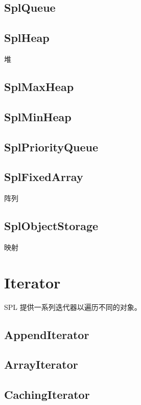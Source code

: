 \section{SplQueue}


\section{SplHeap}

堆


\section{SplMaxHeap}


\section{SplMinHeap}


\section{SplPriorityQueue}


\section{SplFixedArray}

阵列

\section{SplObjectStorage}



映射



\chapter{Iterator}

SPL 提供一系列迭代器以遍历不同的对象。

\section{AppendIterator}


\section{ArrayIterator}


\section{CachingIterator}


